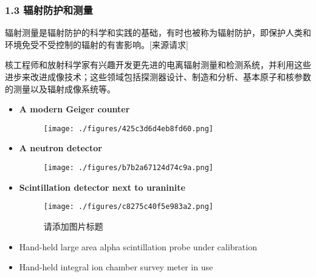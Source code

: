 \subsubsection{1.3 辐射防护和测量}
辐射测量是辐射防护的科学和实践的基础，有时也被称为辐射防护，即保护人类和环境免受不受控制的辐射的有害影响。[来源请求]

核工程师和放射科学家有兴趣开发更先进的电离辐射测量和检测系统，并利用这些进步来改进成像技术；这些领域包括探测器设计、制造和分析、基本原子和核参数的测量以及辐射成像系统等。
\begin{itemize}
\item \textbf{A modern Geiger counter}
\begin{figure}[ht]
\centering
\texttt{[image: ./figures/425c3d6d4eb8fd60.png]}
\caption\label{fig_HGC_10}
\end{figure}
\item \textbf{A neutron detector}
\begin{figure}[ht]
\centering
\texttt{[image: ./figures/b7b2a67124d74c9a.png]}
\caption\label{fig_HGC_11}
\end{figure}
\item \textbf{Scintillation detector next to uraninite}
\begin{figure}[ht]
\centering
\texttt{[image: ./figures/c8275c40f5e983a2.png]}
\caption{请添加图片标题} \label{fig_HGC_12}
\end{figure}

\item Hand-held large area alpha scintillation probe under calibration
\item Hand-held integral ion chamber survey meter in use
\end{itemize}
